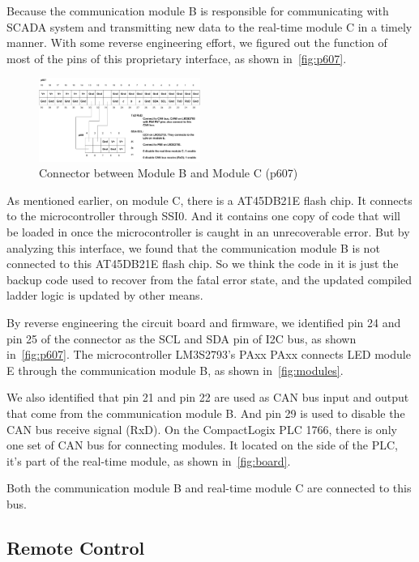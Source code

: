 Because the communication module B is responsible for communicating with SCADA system and transmitting new data to the real-time module C in a timely manner. With some reverse engineering effort, we figured out the function of most of the pins of this proprietary interface, as shown in~\autoref{fig:p607}.

\begin{figure}[th]
	\includegraphics[width=0.47\textwidth]{figures/p607}
	\centering
	\caption{Connector between Module B and Module C (p607)}
	\label{fig:p607}
\end{figure}

As mentioned earlier, on module C, there is a AT45DB21E flash chip. It connects to the microcontroller through SSI0. And it contains one copy of code that will be loaded in once the microcontroller is caught in an unrecoverable error. But by analyzing this interface, we found that the communication module B is not connected to this AT45DB21E flash chip. So we think the code in it is just the backup code used to recover from the fatal error state, and the updated compiled ladder logic is updated by other means.  

By reverse engineering the circuit board and firmware, we identified pin 24 and pin 25 of the connector as the SCL and SDA pin of I2C bus, as shown in~\autoref{fig:p607}. The microcontroller LM3S2793's PAxx PAxx connects LED module E through the communication module B, as shown in~\autoref{fig:modules}.

We also identified that pin 21 and pin 22 are used as CAN bus input and output that come from the communication module B. And pin 29 is used to disable the CAN bus receive signal (RxD). On the CompactLogix PLC 1766, there is only one set of CAN bus for connecting modules. It located on the side of the PLC, it's part of the real-time module, as shown in~\autoref{fig:board}.


Both the communication module B and real-time module C are connected to this bus.


\subsection{Remote Control}

